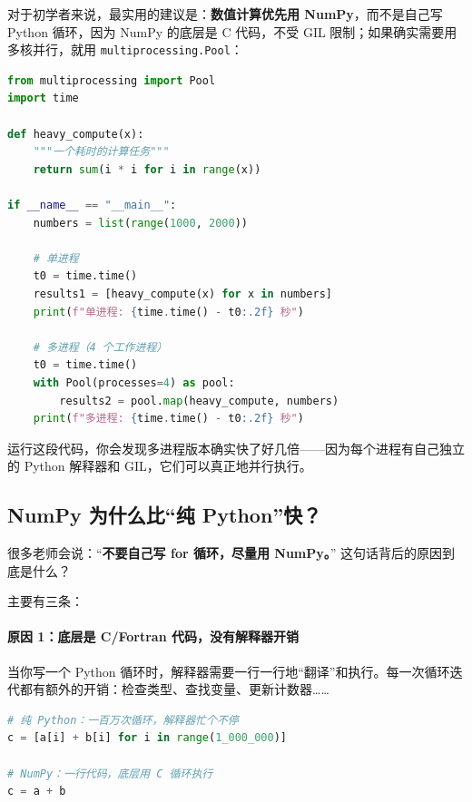 对于初学者来说，最实用的建议是：\textbf{数值计算优先用 NumPy}，而不是自己写 Python 循环，因为 NumPy 的底层是 C 代码，不受 GIL 限制；如果确实需要用多核并行，就用 \verb|multiprocessing.Pool|：

\begin{lstlisting}[style=teaching, language=Python]
from multiprocessing import Pool
import time

def heavy_compute(x):
    """一个耗时的计算任务"""
    return sum(i * i for i in range(x))

if __name__ == "__main__":
    numbers = list(range(1000, 2000))
    
    # 单进程
    t0 = time.time()
    results1 = [heavy_compute(x) for x in numbers]
    print(f"单进程: {time.time() - t0:.2f} 秒")
    
    # 多进程（4 个工作进程）
    t0 = time.time()
    with Pool(processes=4) as pool:
        results2 = pool.map(heavy_compute, numbers)
    print(f"多进程: {time.time() - t0:.2f} 秒")
\end{lstlisting}

运行这段代码，你会发现多进程版本确实快了好几倍——因为每个进程有自己独立的 Python 解释器和 GIL，它们可以真正地并行执行。

\subsection*{NumPy 为什么比“纯 Python”快？}

很多老师会说：“\textbf{不要自己写 for 循环，尽量用 NumPy。}” 这句话背后的原因到底是什么？

主要有三条：

\paragraph{原因 1：底层是 C/Fortran 代码，没有解释器开销}

当你写一个 Python 循环时，解释器需要一行一行地“翻译”和执行。每一次循环迭代都有额外的开销：检查类型、查找变量、更新计数器……

\begin{lstlisting}[style=teaching, language=Python]
# 纯 Python：一百万次循环，解释器忙个不停
c = [a[i] + b[i] for i in range(1_000_000)]

# NumPy：一行代码，底层用 C 循环执行
c = a + b
\end{lstlisting}


